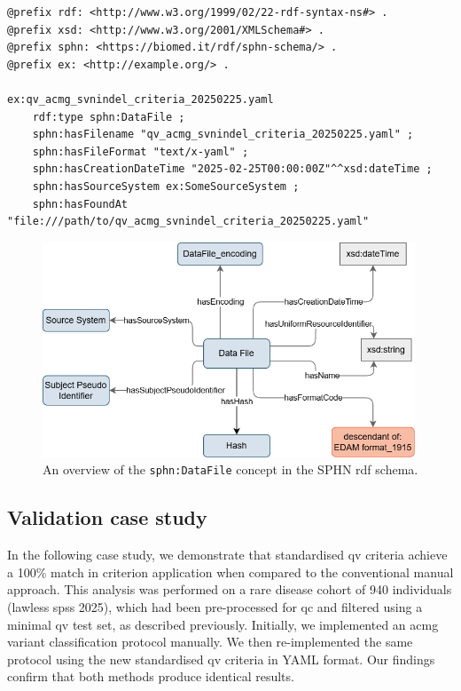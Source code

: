 \begin{tcolorbox}[
    colback=white!0,
    colframe=black,
    boxrule=1pt,
    arc=1mm,
    outer arc=1mm,
    title=\textbf{\refstepcounter{myboxcounter}\label{box:example_concept}Box \themyboxcounter: Use of a QV data file in RDF}
]
\begin{lstlisting}
@prefix rdf: <http://www.w3.org/1999/02/22-rdf-syntax-ns#> .
@prefix xsd: <http://www.w3.org/2001/XMLSchema#> .
@prefix sphn: <https://biomed.it/rdf/sphn-schema/> .
@prefix ex: <http://example.org/> .

ex:qv_acmg_svnindel_criteria_20250225.yaml
    rdf:type sphn:DataFile ;
    sphn:hasFilename "qv_acmg_svnindel_criteria_20250225.yaml" ;
    sphn:hasFileFormat "text/x-yaml" ;
    sphn:hasCreationDateTime "2025-02-25T00:00:00Z"^^xsd:dateTime ;
    sphn:hasSourceSystem ex:SomeSourceSystem ;
    sphn:hasFoundAt "file:///path/to/qv_acmg_svnindel_criteria_20250225.yaml" 
\end{lstlisting}
\end{tcolorbox}

\begin{figure}[!h]
    \centering
   \includegraphics[width=0.99\textwidth]{./images/sphn_DataFile.png}
    \caption{An overview of the \texttt{sphn:DataFile} concept in the SPHN \ac{rdf} schema.}
    \label{fig:sphn_DataFile}
\end{figure}


\subsection{Validation case study}

In the following case study, we demonstrate that standardised \ac{qv} criteria achieve a 100\% match in criterion application when compared to the conventional manual approach. This analysis was performed on a rare disease cohort of 940 individuals (lawless spss 2025), which had been pre-processed for \ac{qc} and filtered using a minimal \ac{qv} test set, as described previously. Initially, we implemented an \ac{acmg} variant classification protocol \cite{richards2015standards} manually. We then re-implemented the same protocol using the new standardised \ac{qv} criteria in YAML format. Our findings confirm that both methods produce identical results.

